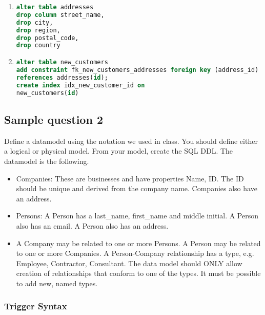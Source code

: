 \begin{enumerate}
\item
\begin{lstlisting}[language=SQL]
alter table addresses
drop column street_name, 
drop city, 
drop region, 
drop postal_code, 
drop country
\end{lstlisting}

\item
\begin{lstlisting}[language=SQL]
alter table new_customers
add constraint fk_new_customers_addresses foreign key (address_id) 
references addresses(id);
create index idx_new_customer_id on
new_customers(id)
\end{lstlisting}
\end{enumerate}

\subsection*{Sample question 2}
Define a datamodel using the notation we used in class. You should define either a logical or physical model. From your model, create the SQL DDL.
The datamodel is the following.
\begin{itemize}
\item Companies: These are businesses and have properties Name, ID. The ID should be unique and derived from the company name. Companies also have an address.
\item Persons: A Person has a last\_name, first\_name and middle initial. A Person also has an email. A Person also has an address.
\item A Company may be related to one or more Persons. A Person may be related to one or more Companies. A Person-Company relationship has a type, e.g. Employee, Contractor, Consultant. The data model should ONLY allow creation of relationships that conform to one of the types. It must be possible to add new, named types.
\end{itemize}

\subsubsection*{Trigger Syntax}

